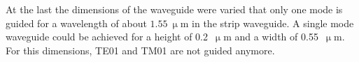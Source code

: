 
At the last the dimensions of the waveguide were varied that only one mode is guided for a wavelength of about $1.55~\upmu$m in the strip waveguide. A single mode waveguide could be achieved for a height of 0.2~$\upmu$m and a width of 0.55~$\upmu$m. For this dimensions, TE01 and TM01 are not guided anymore.
